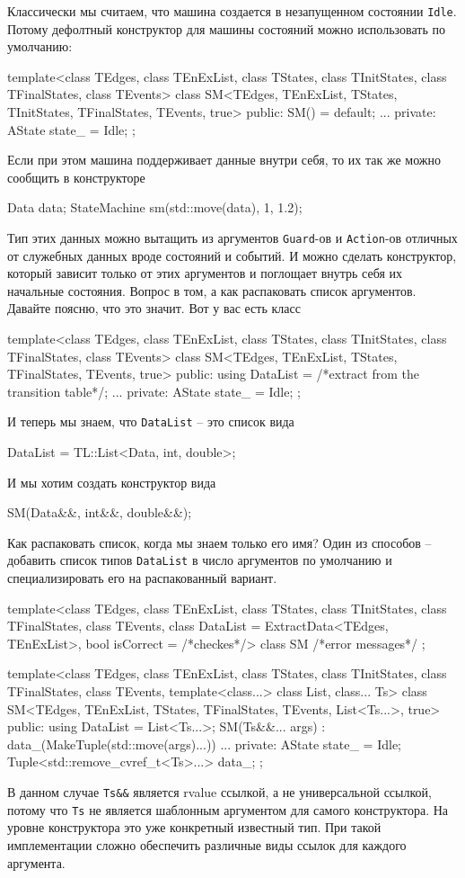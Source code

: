 \documentclass{article}
\begin{document}
{Классически мы считаем, что машина создается в незапущенном состоянии \verb"Idle".
Потому дефолтный конструктор для машины состояний можно использовать по умолчанию:
\begin{cppcode}
template<class TEdges, class TEnExList, class TStates, class TInitStates,
         class TFinalStates, class TEvents>
class SM<TEdges, TEnExList, TStates, TInitStates, TFinalStates, TEvents, true> {
public:
  SM() = default;
  ...
private:
  AState state_ = Idle{};
};
\end{cppcode}
Если при этом машина поддерживает данные внутри себя, то их так же можно сообщить в конструкторе
\begin{cppcode}
Data data;
StateMachine sm(std::move(data), 1, 1.2);
\end{cppcode}
Тип этих данных можно вытащить из аргументов \verb"Guard"-ов и \verb"Action"-ов отличных от служебных данных вроде состояний и событий.
И можно сделать конструктор, который зависит только от этих аргументов и поглощает внутрь себя их начальные состояния.
Вопрос в том, а как распаковать список аргументов.
Давайте поясню, что это значит.
Вот у вас есть класс
\begin{cppcode}
template<class TEdges, class TEnExList, class TStates, class TInitStates,
         class TFinalStates, class TEvents>
class SM<TEdges, TEnExList, TStates, TFinalStates, TEvents, true> {
public:
  using DataList = /*extract from the transition table*/;
  ...
private:
  AState state_ = Idle{};
};
\end{cppcode}
И теперь мы знаем, что \verb"DataList" -- это список вида
\begin{cppcode}[\nonumbers]
DataList = TL::List<Data, int, double>;
\end{cppcode}
И мы хотим создать конструктор вида
\begin{cppcode}[\nonumbers]
SM(Data&&, int&&, double&&);
\end{cppcode}
Как распаковать список, когда мы знаем только его имя?
Один из способов -- добавить список типов \verb"DataList" в число аргументов по умолчанию и специализировать его на распакованный вариант.
\begin{cppcode}
template<class TEdges, class TEnExList, class TStates, class TInitStates,
         class TFinalStates, class TEvents, class DataList = ExtractData<TEdges, TEnExList>,
         bool isCorrect = /*checkes*/>
class SM { /*error messages*/ };

template<class TEdges, class TEnExList, class TStates, class TInitStates,
         class TFinalStates, class TEvents, template<class...> class List, class... Ts>
class SM<TEdges, TEnExList, TStates, TFinalStates, TEvents, List<Ts...>, true> {
public:
  using DataList = List<Ts...>;
  SM(Ts&&... args) : data_(MakeTuple(std::move(args)...)) {}
  ...
private:
  AState state_ = Idle{};
  Tuple<std::remove_cvref_t<Ts>...> data_;
};
\end{cppcode}
В данном случае \verb"Ts&&" является rvalue ссылкой, а не универсальной ссылкой, потому что \verb"Ts" не является шаблонным аргументом для самого конструктора.
На уровне конструктора это уже конкретный известный тип.
При такой имплементации сложно обеспечить различные виды ссылок для каждого аргумента.

}
\end{document}
